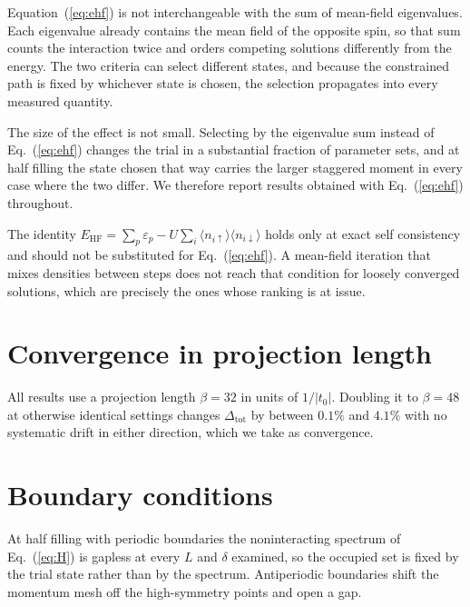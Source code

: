 \documentclass[aps,prb,reprint,superscriptaddress,amsmath,amssymb,floatfix]{revtex4-2}
\begin{document}
Equation~(\ref{eq:ehf}) is not interchangeable with the sum of mean-field
eigenvalues. Each eigenvalue already contains the mean field of the opposite
spin, so that sum counts the interaction twice and orders competing solutions
differently from the energy. The two criteria can select different states, and
because the constrained path is fixed by whichever state is chosen, the
selection propagates into every measured quantity.

The size of the effect is not small. Selecting by the eigenvalue sum instead of
Eq.~(\ref{eq:ehf}) changes the trial in a substantial fraction of parameter
sets, and at half filling the state chosen that way carries the larger staggered
moment in every case where the two differ. We therefore report results obtained
with Eq.~(\ref{eq:ehf}) throughout.

The identity $E_{\mathrm{HF}} = \sum_p \varepsilon_p - U \sum_i \langle
n_{i\uparrow}\rangle \langle n_{i\downarrow}\rangle$ holds only at exact self
consistency and should not be substituted for Eq.~(\ref{eq:ehf}). A mean-field
iteration that mixes densities between steps does not reach that condition for
loosely converged solutions, which are precisely the ones whose ranking is at
issue.


\section{Convergence in projection length}
\label{app:beta}

All results use a projection length $\beta = 32$ in units of $1/|t_0|$. Doubling
it to $\beta = 48$ at otherwise identical settings changes
$\Delta_{\mathrm{tot}}$ by between $0.1\%$ and $4.1\%$ with no systematic drift
in either direction, which we take as convergence.


\section{Boundary conditions}
\label{app:bc}

At half filling with periodic boundaries the noninteracting spectrum of
Eq.~(\ref{eq:H}) is gapless at every $L$ and $\delta$ examined, so the occupied
set is fixed by the trial state rather than by the spectrum. Antiperiodic
boundaries shift the momentum mesh off the high-symmetry points and open a gap.
\end{document}
